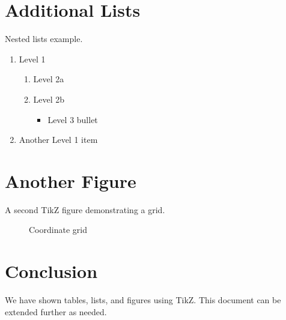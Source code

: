 \documentclass{article}
\begin{document}
\lipsum[13-15]

\section{Additional Lists}
Nested lists example.

\begin{enumerate}
\item Level 1
  \begin{enumerate}
  \item Level 2a
  \item Level 2b
    \begin{itemize}
    \item Level 3 bullet
    \end{itemize}
  \end{enumerate}
\item Another Level 1 item
\end{enumerate}

\lipsum[16-18]

\section{Another Figure}
A second TikZ figure demonstrating a grid.

\begin{figure}[htbp]
\centering
{}
\caption{Coordinate grid}
\label{fig:grid}
\end{figure}

\lipsum[19-21]

\section{Conclusion}
We have shown tables, lists, and figures using TikZ. This document can be extended further as needed.
\end{document}
